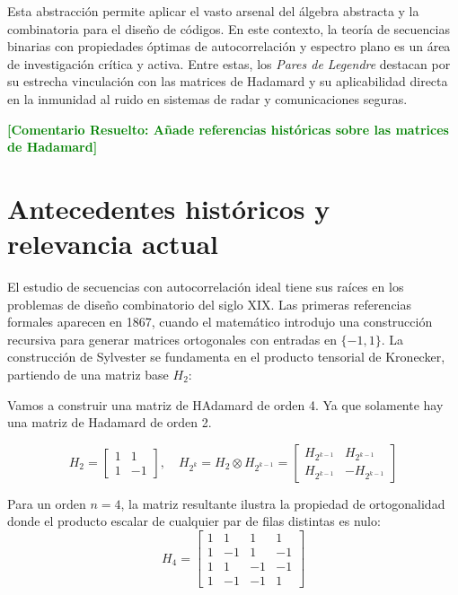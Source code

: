 \documentclass[12pt,a4paper]{tfg_domingo}
\newcommand{\ComentarioR}[1]{\textcolor{green}{\textbf{[Comentario Resuelto:
#1]}}}
\begin{document}
Esta abstracción permite aplicar el vasto arsenal del álgebra
abstracta y la combinatoria para el diseño de códigos.
En este contexto, la teoría de secuencias binarias con propiedades óptimas de
autocorrelación y espectro plano es un área de investigación crítica y
activa. Entre estas, los \emph{Pares de Legendre} destacan por su
estrecha vinculación con las matrices de Hadamard y su aplicabilidad
directa en la inmunidad al ruido en sistemas de radar y comunicaciones
seguras.

\ComentarioR{Añade referencias históricas sobre las matrices de Hadamard}

\section{Antecedentes históricos y relevancia actual}

El estudio de secuencias con autocorrelación ideal tiene sus raíces en los problemas de diseño combinatorio del siglo XIX. Las primeras referencias formales aparecen en 1867, cuando el matemático \cite{Sylvester01121867} introdujo una construcción recursiva para generar matrices ortogonales con entradas en $\{-1, 1\}$. La construcción de Sylvester se fundamenta en el producto tensorial de Kronecker, partiendo de una matriz base $H_2$:



\begin{tcolorbox}[colback=blue!5!white,colframe=blue!75!black,title=Ejemplo de construcción de matriz de Hadamard]

Vamos a construir una matriz de HAdamard de orden 4. Ya que solamente hay una matriz de Hadamard de orden 2.

$$ H_2 = \begin{bmatrix} 1 & 1 \\ 1 & -1 \end{bmatrix}, \quad H_{2^k} = H_2 \otimes H_{2^{k-1}} = \begin{bmatrix} H_{2^{k-1}} & H_{2^{k-1}} \\ H_{2^{k-1}} & -H_{2^{k-1}} \end{bmatrix} $$

Para un orden $n=4$, la matriz resultante ilustra la propiedad de ortogonalidad donde el producto escalar de cualquier par de filas distintas es nulo:
$$ H_4 = \begin{bmatrix} 1 & 1 & 1 & 1 \\ 1 & -1 & 1 & -1 \\ 1 & 1 & -1 & -1 \\ 1 & -1 & -1 & 1 \end{bmatrix} $$

\end{tcolorbox}
\end{document}
